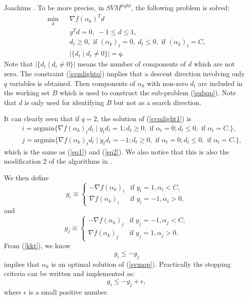 \documentclass[11pt]{article}
\newcommand{\svmlight}{$SVM^{light}$}
\theoremstyle{break}
\begin{document}
 Joachims \citeyear{TJ98a}.
To be more precise,
in \svmlight, 
the following problem is solved:
\begin{eqnarray}
\min_d && \nabla f(\alpha_k)^T d \nonumber \\
&& y^Td = 0, \;  -1 \leq d \leq 1, \label{svmlight1} \\
&& d_t \geq 0, \mbox{ if } (\alpha_k)_t = 0, \; 
d_t \leq 0, \mbox{ if } (\alpha_k)_t = C, \nonumber \\
&& |\{d_t \mid d_t \neq 0\}| = q. \label{svmlightq}
\end{eqnarray}
Note that $| \{ d_t \mid d_t \neq 0 \}|$
means the number of components of $d$ which are not zero.
The constraint (\ref{svmlightq}) implies that a 
descent direction involving only $q$ variables is
obtained. Then  components of $\alpha_k$ with 
non-zero $d_t$ are included in the working set
$B$ which is used
to construct the sub-problem (\ref{subqp}). 
Note that $d$ is only used for identifying 
$B$ but not as a search direction.

It can clearly seen that if $q=2$,
the solution of
(\ref{svmlight1}) is
\begin{eqnarray*}
&& i = 
\mbox{argmin}
\{\nabla f(\alpha_k)_t d_t
\mid
y_t d_t = 1; 
 d_t \geq 0, \mbox{ if }
\alpha_t = 0;
 d_t \leq 0, \mbox{ if }
\alpha_t = C.
\}, \\
&& j = \mbox{argmin}
\{\nabla f(\alpha_k)_t d_t
\mid
y_t d_t = -1; 
 d_t \geq 0, \mbox{ if }
\alpha_t = 0;
 d_t \leq 0, \mbox{ if }
\alpha_t = C.
\},
\end{eqnarray*}
which is the same as (\ref{eq1}) and
(\ref{eq2}).
We also notice that
this is also 
the modification 2 of 
the algorithms in \cite{SSK99a}.

We then define
\begin{equation}
\label{O1}
g_{i} 
\equiv \begin{cases}
-\nabla f(\alpha_k)_{i}
& \mbox{if }
y_{i} = 1, \alpha_{i} < C,\\
\nabla f(\alpha_k)_{i}
& \mbox{if }
y_{i} = -1, \alpha_{i} > 0,
\end{cases}
\end{equation}
and 
\begin{equation}
\label{O2}
g_{j} 
\equiv \begin{cases}
-\nabla f(\alpha_k)_{j}
& \mbox{if }
y_{j} = -1, \alpha_{j} < C,\\
\nabla f(\alpha_k)_{j}
& \mbox{if }
y_{j} = 1, \alpha_{j} > 0.
\end{cases}
\end{equation}
From (\ref{kkt}),
we know
\begin{equation}
\label{stop_noepsilon}
g_{i}  \leq - g_{j}
\end{equation}
implies 
that 
$\alpha_k$ is an optimal solution of 
(\ref{svmqp}).
Practically the stopping
criteria can be written and
implemented as: 
\begin{equation}
\label{stop}
g_{i}  \leq - g_{j} + \epsilon,
\end{equation}
where $\epsilon$ is a small
positive 
number.
\end{document}
